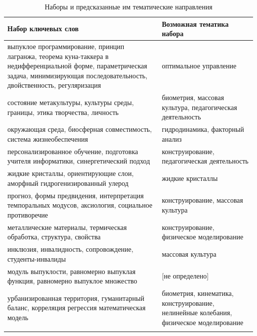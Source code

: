 \begin{table}[H]
\small
\begin{tabularx}{16cm}{|X|X|} 
        \hline
        Набор ключевых слов & Возможная тематика набора \\ \hline 
        выпуклое программирование, принцип лагранжа, теорема куна-таккера в недифференциальной форме, параметрическая задача, минимизирующая последовательность, двойственность, регуляризация & оптимальное управление \\ \hline
        состояние метакультуры, культуры среды, границы, этика творчества, личность & биометрия, массовая культура, педагогическая деятельность \\ \hline 
        окружающая среда, биосферная совместимость, система жизнеобеспечения & гидродинамика, факторный анализ \\ \hline
        персонализированное обучение, подготовка учителя информатики, синергетический подход & конструирование, педагогическая деятельность \\ \hline
        жидкие кристаллы, ориентирующие слои, аморфный гидрогенизированный улерод & жидкие кристаллы \\ \hline
        прогноз, формы предвидения, интерпретация темпоральных модусов, аксиология, социальное противоречие & конструирование, массовая культура \\ \hline
        металлические материалы, термическая обработка, структура, свойства & конструирование, физическое моделирование \\ \hline
        инклюзия, инвалидность, сопровождение, студенты-инвалиды  & массовая культура \\ \hline
        модуль выпуклости, равномерно выпуклая функция, равномерно выпуклое множество & [не определено] \\ \hline
        урбанизированная территория, гуманитарный баланс, корреляция регрессия математическая модель & биометрия, кинематика, конструирование, нелинейные колебания, физическое моделирование \\ \hline
        \caption{Наборы и предсказанные им тематические направления} \label{tbl:theme_table}
\end{tabularx}
\end{table}


